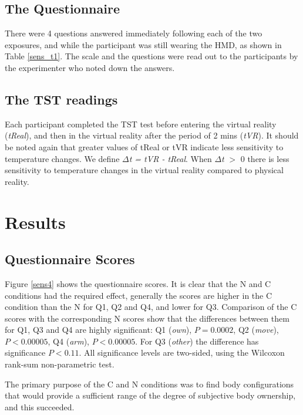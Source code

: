 \documentclass[
		twoside,openright,titlepage,numbers=noenddot,manychapters,
		headinclude,%
                footinclude=false,cleardoublepage=empty,
                BCOR=5mm,
		fontsize=11pt, %
                 enabledeprecatedfontcommands]{scrreprt}
\begin{document}
\subsection{ The Questionnaire}

There were 4 questions answered immediately following each of the two exposures, and while the participant was still wearing the HMD, as shown in Table \ref{sens_t1}. The scale and the questions were read out to the participants by the experimenter who noted down the answers.



\subsection{The TST readings}

Each participant completed the TST test before entering the virtual reality (\emph{tReal}), and then in the virtual reality after the period of 2 mins (\emph{tVR}). It should be noted again that greater values of tReal or tVR indicate less sensitivity to temperature changes. We define  $\Delta$\emph{t = tVR - tReal}. When $\Delta$\emph{t} $>$ 0  there is less sensitivity to temperature changes in the virtual reality compared to physical reality.

\section{Results}

\subsection{Questionnaire Scores}

Figure \ref{sens4} shows the questionnaire scores. It is clear that the N and C conditions had the required effect, generally the scores are higher in the C condition than the N for Q1, Q2 and Q4, and lower for Q3. 
Comparison of the C scores with the corresponding N scores show that the differences between them for Q1, Q3 and Q4 are highly significant: Q1 (\emph{own}), $P = 0.0002$,  Q2 (\emph{move}), $P < 0.00005$, Q4 (\emph{arm}), $P < 0.00005$. For Q3 (\emph{other}) the difference has significance $P < 0.11$. All significance levels are two-sided, using the Wilcoxon rank-sum non-parametric test.

The primary purpose of the C and N conditions was to find body configurations that would provide a sufficient range of the degree of subjective body ownership, and this succeeded. 
\end{document}
